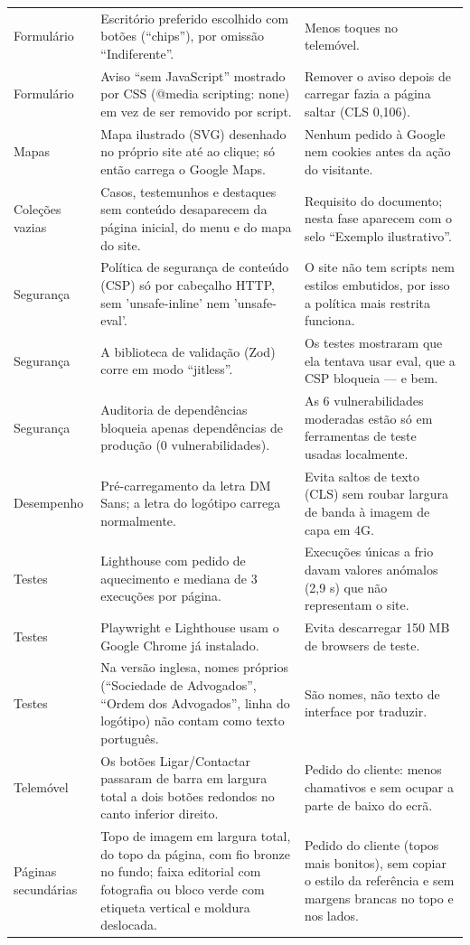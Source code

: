 \begin{longtable}{p{3.2cm}p{6.4cm}p{5.4cm}}
Formulário & Escritório preferido escolhido com botões (``chips''), por omissão ``Indiferente''. & Menos toques no telemóvel. \\
Formulário & Aviso ``sem JavaScript'' mostrado por CSS (@media scripting: none) em vez de ser removido por script. & Remover o aviso depois de carregar fazia a página saltar (CLS 0,106). \\
Mapas & Mapa ilustrado (SVG) desenhado no próprio site até ao clique; só então carrega o Google Maps. & Nenhum pedido à Google nem cookies antes da ação do visitante. \\
Coleções vazias & Casos, testemunhos e destaques sem conteúdo desaparecem da página inicial, do menu e do mapa do site. & Requisito do documento; nesta fase aparecem com o selo ``Exemplo ilustrativo''. \\
Segurança & Política de segurança de conteúdo (CSP) só por cabeçalho HTTP, sem 'unsafe-inline' nem 'unsafe-eval'. & O site não tem scripts nem estilos embutidos, por isso a política mais restrita funciona. \\
Segurança & A biblioteca de validação (Zod) corre em modo ``jitless''. & Os testes mostraram que ela tentava usar eval, que a CSP bloqueia — e bem. \\
Segurança & Auditoria de dependências bloqueia apenas dependências de produção (0 vulnerabilidades). & As 6 vulnerabilidades moderadas estão só em ferramentas de teste usadas localmente. \\
Desempenho & Pré-carregamento da letra DM Sans; a letra do logótipo carrega normalmente. & Evita saltos de texto (CLS) sem roubar largura de banda à imagem de capa em 4G. \\
Testes & Lighthouse com pedido de aquecimento e mediana de 3 execuções por página. & Execuções únicas a frio davam valores anómalos (2,9 s) que não representam o site. \\
Testes & Playwright e Lighthouse usam o Google Chrome já instalado. & Evita descarregar 150 MB de browsers de teste. \\
Testes & Na versão inglesa, nomes próprios (``Sociedade de Advogados'', ``Ordem dos Advogados'', linha do logótipo) não contam como texto português. & São nomes, não texto de interface por traduzir. \\
Telemóvel & Os botões Ligar/Contactar passaram de barra em largura total a dois botões redondos no canto inferior direito. & Pedido do cliente: menos chamativos e sem ocupar a parte de baixo do ecrã. \\
Páginas secundárias & Topo de imagem em largura total, do topo da página, com fio bronze no fundo; faixa editorial com fotografia ou bloco verde com etiqueta vertical e moldura deslocada. & Pedido do cliente (topos mais bonitos), sem copiar o estilo da referência e sem margens brancas no topo e nos lados. \\

\end{longtable}
